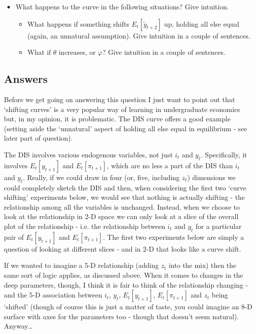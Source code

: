 \documentclass[authoryear,11pt]{elsarticle}
\begin{document}
\begin{itemize}
\item	What happens to the curve in the following situations? Give intuition.
	\begin{itemize}
	\item	What happens if something shifts $E_{t}[\tilde{y}_{t+2}]$ up, holding all else equal (again, an unnatural assumption). Give intuition in a couple of sentences.
	\item	What if $\theta$ increases, or $\varphi$? Give intuition in a couple of sentences.
	\end{itemize}
\end{itemize}

\subsection*{Answers}
Before we get going on answering this question I just want to point out that `shifting curves' is a very popular way of learning in undergraduate economics but, in my opinion, it is problematic. The DIS curve offers a good example (setting aside the `unnatural' aspect of holding all else equal in equilibrium - see later part of question).

The DIS involves various endogenous variables, not just $i_{t}$ and $y_{t}$. Specifically, it involves $E_{t}[y_{t+1}]$ and $E_{t}[\pi_{t+1}]$, which are no less a part of the DIS than $i_{t}$ and $y_{t}$. Really, if we could draw in four (or, five, including $z_{t}$) dimensions we could completely sketch the DIS and then, when considering the first two `curve shifting' experiments below, we would see that nothing is actually shifting - the relationship among all the variables is unchanged. Instead, when we choose to look at the relationship in 2-D space we can only look at a slice of the overall plot of the relationship - i.e. the relationship between $i_{t}$ and $y_{t}$ for a particular pair of $E_{t}[y_{t+1}]$ and $E_{t}[\pi_{t+1}]$. The first two experiments below are simply a question of looking at different slices - and in 2-D that looks like a curve shift.

If we wanted to imagine a 5-D relationship (adding $z_{t}$ into the mix) then the same sort of logic applies, as discussed above. When it comes to changes in the deep parameters, though, I think it is fair to think of the relationship changing - and the 5-D association between $i_{t}$, $y_{t}$, $E_{t}[y_{t+1}]$, $E_{t}[\pi_{t+1}]$ and $z_{t}$ being `shifted' (though of course this is just a matter of taste, you could imagine an 8-D surface with axes for the parameters too - though that doesn't seem natural). Anyway\ldots
\end{document}
